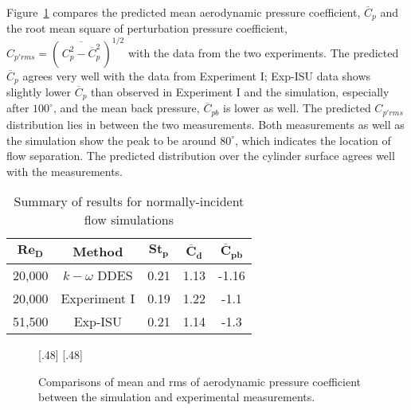Figure~\ref{fig:Cp_compared_Re20k} compares the predicted mean aerodynamic
pressure coefficient, $\overline{C}_p$ and the root mean square of perturbation
pressure coefficient, $C_{p'rms} = \left(\,\overline{C^2_p -
\overline{C}^2_p}\,\right)^{1/2}$ with the data from the two experiments. The
predicted $\overline{C}_p$ agrees very well with the data from Experiment I;
Exp-ISU data shows slightly lower $\overline{C}_p$ than observed in
Experiment I and the simulation, especially after $100^\circ$, and the mean
back pressure, $\overline{C}_{pb}$ is lower as well. The predicted
$C_{p'rms}$ distribution lies in between the two measurements. Both
measurements as well as the simulation show the peak to be around $80^\circ$,
which indicates the location of flow separation. The predicted distribution
over the cylinder surface agrees well with the measurements.
%
\begin{table}[htb!]
  \caption{Summary of results for normally-incident flow simulations} 
  \label{tab:comparisonRe20k} 
  \begin{center}
  \begin{tabular}{c|c|c|c|c}
      $\boldsymbol{Re_D}$ & \textbf{Method} & $\boldsymbol{St_p}$ & $\boldsymbol{\overline{C}_d}$ & $\boldsymbol{\overline{C}_{pb}}$ \\ \hline
      \hline
      20,000 & $k-\omega$ DDES & 0.21 & 1.13 & -1.16 \\ \hline
      20,000 & Experiment I    & 0.19 & 1.22 & -1.1  \\ \hline
      51,500 & Exp-ISU         & 0.21 & 1.14 & -1.3  \\ \hline
      \hline
  \end{tabular}
  \end{center}
\end {table}

\begin{figure}[htb!]
  \centering
    [.48\linewidth]{}
  \hspace*{\fill}
    [.48\linewidth]{}
  \caption{Comparisons of mean and rms of aerodynamic pressure coefficient
  between the simulation and experimental measurements.}
  \label{fig:Cp_compared_Re20k}
\end{figure}

